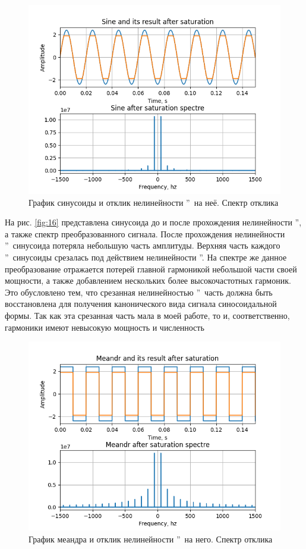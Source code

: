 \begin{figure}[H]
	\centering
	\includegraphics[width=0.75\linewidth]{body/images/sine-after-saturation-and-its-spectre.png}
	\caption{График синусоиды и отклик нелинейности
	\textquotedblright\ на неё. Спектр отклика}
	\label{fig:19}
\end{figure}

На рис. \ref{fig:16} представлена синусоида до и после прохождения
нелинейности \textquotedblright, а
также спектр преобразованного сигнала. После прохождения
нелинейности \textquotedblright\ 
синусоида потеряла небольшую часть амплитуды. Верхняя часть
каждого \textquotedblright\ синусоиды срезалась
под действием нелинейности \textquotedblleftНасыщение\textquotedblright.
На спектре же данное преобразование отражается потерей
главной гармоникой небольшой части своей мощности, а также
добавлением нескольких более высокочастотных гармоник. Это
обусловлено тем, что срезанная нелинейностью
\textquotedblright\ часть должна быть
восстановлена для получения канонического вида сигнала
синосоидальной формы. Так как эта срезанная часть мала
в моей работе, то и, соответственно, гармоники имеют невысокую
мощность и численность

\begin{figure}[H]
	\centering
	\includegraphics[width=0.75\linewidth]{body/images/meandr-after-saturation-and-its-spectre.png}
	\caption{График меандра и отклик нелинейности
	\textquotedblright\ на него. Спектр отклика}
	\label{fig:20}
\end{figure}


